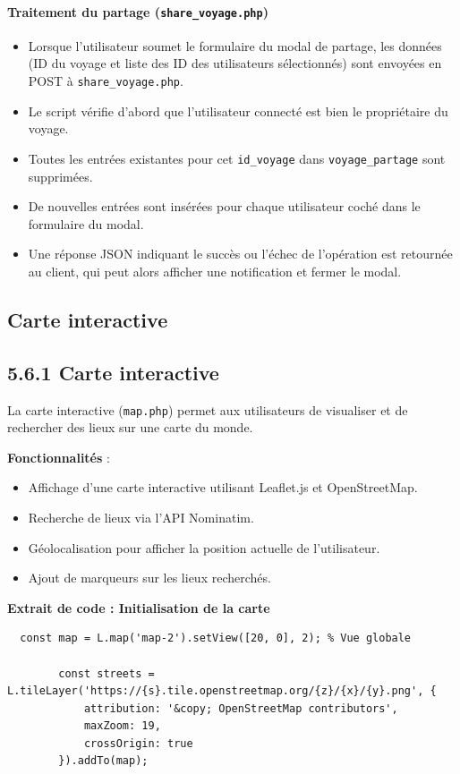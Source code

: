 \documentclass[a4paper,12pt]{article}
\begin{document}
\paragraph{Traitement du partage (\texttt{share\_voyage.php})}
\begin{itemize}
    \item Lorsque l'utilisateur soumet le formulaire du modal de partage, les données (ID du voyage et liste des ID des utilisateurs sélectionnés) sont envoyées en POST à \texttt{share\_voyage.php}.
    \item Le script vérifie d'abord que l'utilisateur connecté est bien le propriétaire du voyage.
            \item Toutes les entrées existantes pour cet \texttt{id\_voyage} dans \texttt{voyage\_partage} sont supprimées.
            \item De nouvelles entrées sont insérées pour chaque utilisateur coché dans le formulaire du modal.
    \item Une réponse JSON indiquant le succès ou l'échec de l'opération est retournée au client, qui peut alors afficher une notification et fermer le modal.
\end{itemize}

\subsection{Carte interactive}
\subsection*{5.6.1 Carte interactive}

La carte interactive (\texttt{map.php}) permet aux utilisateurs de visualiser et de rechercher des lieux sur une carte du monde.

\textbf{Fonctionnalités} :
\begin{itemize}
  \item Affichage d'une carte interactive utilisant Leaflet.js et OpenStreetMap.
  \item Recherche de lieux via l'API Nominatim.
  \item Géolocalisation pour afficher la position actuelle de l'utilisateur.
  \item Ajout de marqueurs sur les lieux recherchés.
\end{itemize}

\textbf{Extrait de code : Initialisation de la carte}
\begin{lstlisting}
  const map = L.map('map-2').setView([20, 0], 2); % Vue globale

        const streets = L.tileLayer('https://{s}.tile.openstreetmap.org/{z}/{x}/{y}.png', {
            attribution: '&copy; OpenStreetMap contributors',
            maxZoom: 19,
            crossOrigin: true
        }).addTo(map);
\end{lstlisting}
\end{document}
